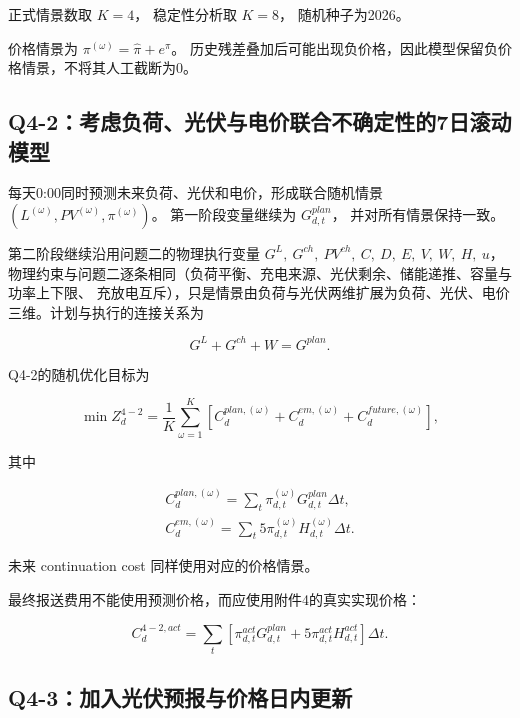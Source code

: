 正式情景数取 \(K=4\)， 稳定性分析取 \(K=8\)， 随机种子为2026。

价格情景为 \(\pi^{(\omega)}
=
\hat\pi+e^\pi\)。 历史残差叠加后可能出现负价格，因此模型保留负价格情景，不将其人工截断为0。

\subsection{Q4-2：考虑负荷、光伏与电价联合不确定性的7日滚动模型}

每天0:00同时预测未来负荷、光伏和电价，形成联合随机情景 \(\left(
L^{(\omega)},
PV^{(\omega)},
\pi^{(\omega)}
\right)\)。 第一阶段变量继续为 \(G^{plan}_{d,t}\)， 并对所有情景保持一致。

第二阶段继续沿用问题二的物理执行变量 \(G^L,\ G^{ch},\ PV^{ch},\ C,\ D,\ E,\ V,\ W,\ H,\ u\)，
物理约束与问题二逐条相同（负荷平衡、充电来源、光伏剩余、储能递推、容量与功率上下限、
充放电互斥），只是情景由负荷与光伏两维扩展为负荷、光伏、电价三维。计划与执行的连接关系为

\begin{equation}
G^L+G^{ch}+W=G^{plan}.
\end{equation}

Q4-2的随机优化目标为

\begin{equation}
\min Z_d^{4-2}
=
\frac1K
\sum_{\omega=1}^{K}
\left[
C_d^{plan,(\omega)}
+
C_d^{em,(\omega)}
+
C_d^{future,(\omega)}
\right],
\end{equation}

其中

\begin{equation}
\begin{gathered}
C_d^{plan,(\omega)}
=
\sum_t
\pi_{d,t}^{(\omega)}
G_{d,t}^{plan}
\Delta t,\\
C_d^{em,(\omega)}
=
\sum_t5\pi_{d,t}^{(\omega)}
H_{d,t}^{(\omega)}
\Delta t.
\end{gathered}
\end{equation}

未来 continuation cost 同样使用对应的价格情景。

最终报送费用不能使用预测价格，而应使用附件4的真实实现价格：

\begin{equation}
C_d^{4-2,act}
=
\sum_t
\left[
\pi_{d,t}^{act}G_{d,t}^{plan}
+
5\pi_{d,t}^{act}H_{d,t}^{act}
\right]\Delta t.
\end{equation}

\subsection{Q4-3：加入光伏预报与价格日内更新}

